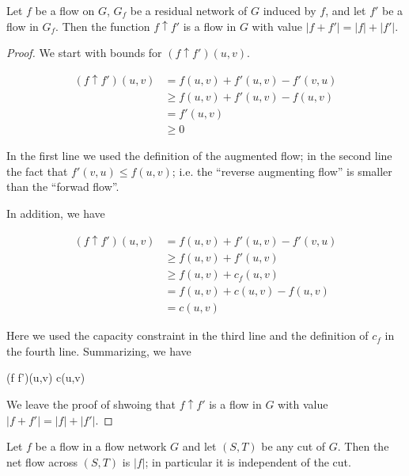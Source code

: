 
\begin{theorem}
  Let $f$ be a flow on $G$, $G_f$ be a residual network of $G$ induced by $f$, and let $f'$ be a flow in $G_f$. Then the function $f \uparrow f'$ is a flow in $G$ with value $|f + f'| = |f| + |f'|$.
\end{theorem}

\begin{proof}
  We start with bounds for $(f \uparrow f')(u,v)$.

  \begin{align*}
    (f \uparrow f')(u,v) &= f(u,v) + f'(u,v) - f'(v,u) \\
                         &\geq f(u,v) + f'(u,v) - f(u,v) \\
                         &= f'(u,v) \\
                         &\geq 0
  \end{align*}

  In the first line we used the definition of the augmented flow; in the second line the fact that $f'(v,u) \leq f(u,v)$; i.e. the ``reverse augmenting flow'' is smaller than the ``forwad flow''.
  
  In addition, we have

  \begin{align*}
    (f \uparrow f')(u,v) &= f(u,v) + f'(u,v) - f'(v,u) \\
                         &\geq f(u,v) + f'(u,v) \\
                         &\geq f(u,v) + c_f(u,v) \\
                         &= f(u,v) + c(u,v) - f(u,v) \\
                         &= c(u,v)    
  \end{align*}

  Here we used the capacity constraint in the third line and the definition of $c_f$ in the fourth line. Summarizing, we have

   \geq (f \uparrow f')(u,v) \geq c(u,v)
  \eee

  We leave the proof of shwoing that $f \uparrow f'$ is a flow in $G$ with value $|f + f'| = |f| + |f'|$.
  
\end{proof}



\begin{theorem}
  Let $f$ be a flow in a flow network $G$ and let $(S,T)$ be any cut of $G$. Then the net flow across $(S,T)$ is $|f|$; in particular it is independent of the cut.
\end{theorem}

